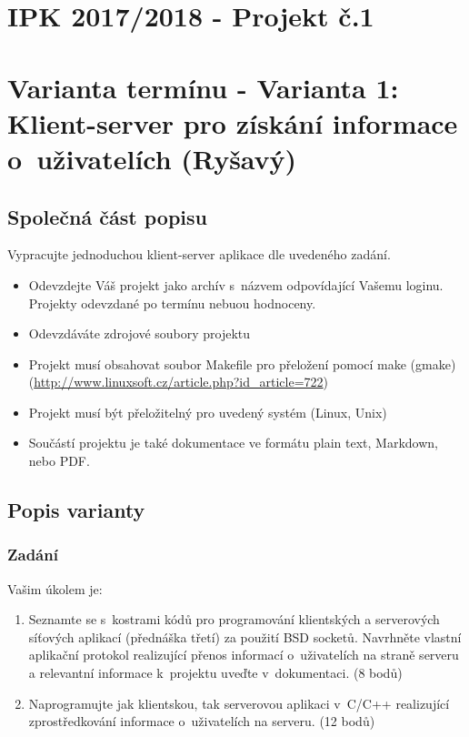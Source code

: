 \documentclass[11pt, a4paper, titlepage]{article}
\begin{document}
\section*{IPK 2017/2018 - Projekt č.1}

\section*{Varianta termínu - Varianta 1: Klient-server pro získání informace o~uživatelích (Ryšavý)}
\bigskip


\subsection*{Společná část popisu}

Vypracujte jednoduchou klient-server aplikace dle uvedeného zadání.

\begin{itemize}
	\item Odevzdejte Váš projekt jako archív s~názvem odpovídající Vašemu loginu. Projekty odevzdané po termínu nebuou hodnoceny.
	\item Odevzdáváte zdrojové soubory projektu
	\item Projekt musí obsahovat soubor Makefile pro přeložení pomocí make (gmake) (\url{http://www.linuxsoft.cz/article.php?id_article=722})
	\item Projekt musí být přeložitelný pro uvedený systém (Linux, Unix)
	\item Součástí projektu je také dokumentace  ve formátu plain text, Markdown, nebo PDF.
\end{itemize}


\subsection*{Popis varianty}

\subsubsection*{\textbf{Zadání}}

Vašim úkolem je:

\begin{enumerate}
	\item Seznamte se s~kostrami kódů pro programování klientských a serverových síťových aplikací (přednáška třetí) za použití BSD socketů. Navrhněte vlastní aplikační protokol realizující přenos informací o~uživatelích na straně serveru a relevantní informace k~projektu uveďte v~dokumentaci. (8 bodů)
	\item Naprogramujte jak klientskou, tak serverovou aplikaci v~C/C++ realizující zprostředkování informace o~uživatelích na serveru. (12 bodů)
\end{enumerate}
\end{document}
